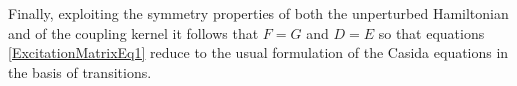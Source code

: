 \documentclass[reprint,aps,prb]{revtex4-1}
\begin{document}
Finally, exploiting the symmetry properties of both the unperturbed Hamiltonian and of the coupling kernel it follows that $F=G$ and $D=E$ so that equations
\eqref{ExcitationMatrixEq1} reduce to the usual formulation of the Casida equations in the basis of transitions. 







%

\end{document}
